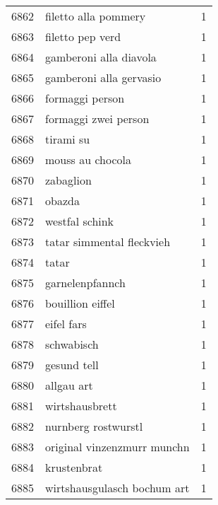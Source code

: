 \begin{tabular}{llr}
6862 &                               filetto alla pommery &      1 \\
6863 &                                   filetto pep verd &      1 \\
6864 &                             gamberoni alla diavola &      1 \\
6865 &                            gamberoni alla gervasio &      1 \\
6866 &                                    formaggi person &      1 \\
6867 &                               formaggi zwei person &      1 \\
6868 &                                          tirami su &      1 \\
6869 &                                   mouss au chocola &      1 \\
6870 &                                          zabaglion &      1 \\
6871 &                                             obazda &      1 \\
6872 &                                     westfal schink &      1 \\
6873 &                          tatar simmental fleckvieh &      1 \\
6874 &                                              tatar &      1 \\
6875 &                                    garnelenpfannch &      1 \\
6876 &                                   bouillion eiffel &      1 \\
6877 &                                         eifel fars &      1 \\
6878 &                                         schwabisch &      1 \\
6879 &                                        gesund tell &      1 \\
6880 &                                         allgau art &      1 \\
6881 &                                     wirtshausbrett &      1 \\
6882 &                                nurnberg rostwurstl &      1 \\
6883 &                        original vinzenzmurr munchn &      1 \\
6884 &                                        krustenbrat &      1 \\
6885 &                        wirtshausgulasch bochum art &      1 \\

\end{tabular}
